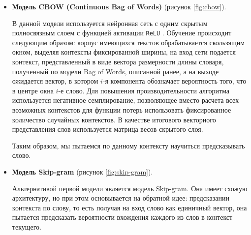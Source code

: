 \documentclass[../diploma.tex]{subfiles}
\begin{document}
	\begin{itemize}
		\item
		\textbf{Модель CBOW (Continuous Bag of Words)} (рисунок \ref{fig:cbow}). 

		В данной модели используется нейронная сеть с одним скрытым полносвязным слоем с функцией активации \texttt{ReLU} \cite{article:relu}.
		Обучение происходит следующим образом: корпус имеющихся текстов обрабатывается скользящим окном, выделяя контексты фиксированной ширины, 
		на вход сети подается контекст, представленный в виде вектора размерности длины словаря, полученный по модели Bag of Words, описанной ранее, 
		а на выходе ожидается вектор, в котором $i$-я компонента обозначает вероятность того, что в центре окна $i$-е слово.
		Для повышения производительности алгоритма используется негативное семплирование, 
		позволяющее вместо расчета всех возможных контекстов для функции потерь использовать фиксированное количество случайных контекстов.
		В качестве итогового векторного представления слов используется матрица весов скрытого слоя.

		Таким образом, мы пытаемся по данному контексту научиться предсказывать слово.
		
		\item
		\textbf{Модель Skip-gram} (рисунок \ref{fig:skip-gram}). 

		Альтернативой первой модели является модель Skip-gram.
		Она имеет схожую архитектуру, но при этом основывается на обратной идее: предсказании контекста по слову, 
		то есть получая на вход слово как единичный вектор, она пытается предсказать вероятности вхождения каждого из слов в контекст текущего.			
	\end{itemize}
\end{document}
